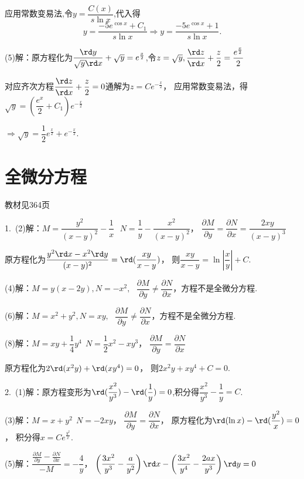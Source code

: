   应用常数变易法,令$y=\dfrac{C(x)}{s \ln x}$,代入得
  $$y=\dfrac{-5e^{ \cos x}+C_1}{s \ln x} \Rightarrow y=\dfrac{-5e^{ \cos x}+1}{s \ln x}.$$

  (5)解：原方程化为$\dfrac{\rd y}{\sqrt y \rd x}+\sqrt y =e^{\frac{x}{2}}$,令$z=\sqrt y,\dfrac{\rd z}{\rd x}+\dfrac{z}{2}=\dfrac{e^{\frac{x}{2}}}{2}$

  对应齐次方程$\dfrac{\rd z}{\rd x}+\dfrac{z}{2}=0$通解为$z=Ce^{-\frac{x}{2}}$，
  应用常数变易法，得$\sqrt{y} =(\dfrac{e^x}{2}+C_1)e^{-\frac{x}{2}}$

  $\Rightarrow \sqrt{y} = \dfrac{1}{2}e^{\frac{x}{2}}+e^{-\frac{x}{2}}$.


\section{全微分方程}
\begin{flushright}
  \color{zhanqing!80}
   教材见364页
\end{flushright}
  1.~(2)解：$M=\dfrac{y^2}{(x-y)^2}-\dfrac{1}{x}~~~N=\dfrac{1}{y}-\dfrac{x^2}{(x-y)^2}$，
  $\dfrac{{\partial M}}{{\partial y}} = \dfrac{{\partial N}}{{\partial x}} = \dfrac{{2xy}}{{(x - y)^3}}$

  原方程化为$\dfrac{y^2\rd x-x^2\rd y}{(x-y)^2}=\rd (\dfrac{xy}{x-y})$，
  则$\dfrac{xy}{x-y}= \ln \left| {\dfrac{x}{y}} \right|+C$.

  (4)解：$M=y(x-2y),N=-x^2,~~~\dfrac{{\partial M}}{{\partial y}}  \ne  \dfrac{{\partial N}}{{\partial x}} $，方程不是全微分方程.

  (6)解：$M=x^2+y^2,N=xy,~~~\dfrac{{\partial M}}{{\partial y}}  \ne  \dfrac{{\partial N}}{{\partial x}} $，方程不是全微分方程.

  (8)解：$M=xy+\dfrac{1}{4}y^4~~N=\dfrac{1}{2}x^2-xy^3$，
  $\dfrac{{\partial M}}{{\partial y}} = \dfrac{{\partial N}}{{\partial x}} $

  原方程化为$2\rd (x^2y)+\rd (xy^4)=0$，
  则$2x^2y+xy^4+C=0$.

  2.~(1)解：原方程变形为$\rd (\dfrac{x^2}{y^3})-\rd (\dfrac{1}{y})=0$,积分得$\dfrac{x^2}{y^3}-\dfrac{1}{y}=C$.

  (3)解：$M=x+y^2~~N=-2xy$，
  $\dfrac{{\partial M}}{{\partial y}} = \dfrac{{\partial N}}{{\partial x}}$，
  原方程化为$\rd ( \ln x)-\rd (\dfrac{y^2}{x})=0$，
  积分得$x=Ce^{\frac{y^2}{x}}$.

  (5)解：$\dfrac{\frac{{\partial M}}{{\partial y}} - \frac{{\partial N}}{{\partial x}}}{-M}=-\dfrac{4}{y}$，
  $\left(\dfrac{3x^2}{y^3}-\dfrac{a}{y^2}\right)\rd x-\left(\dfrac{3x^2}{y^4}-\dfrac{2ax}{y^3}\right)\rd y=0$


